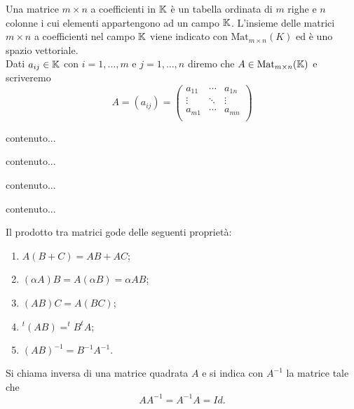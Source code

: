 
\begin{definition}[Matrice]
	Una matrice $ m \times n $ a coefficienti in $ \mathbb{K} $ è un tabella ordinata di $ m $ righe e $ n $ colonne i cui elementi appartengono ad un campo $ \mathbb{K} $. L'insieme delle matrici $ m \times n $ a coefficienti nel campo $ \mathbb{K} $ viene indicato con $ \mathrm{Mat}_{m \times n}{(K)} $ ed è uno spazio vettoriale. \\ Dati $ a_{ij} \in \mathbb{K} $ con $ i = 1, \ldots, m $ e $ j = 1, \ldots, n $ diremo che $ A \in \mathrm{Mat}_{m \times n} (\mathbb{K}) $ e scriveremo
	\[ A = (a_{ij}) =
	\begin{pmatrix}
		a_{11} & \cdots  & a_{1n} \\
		\vdots & \ddots & \vdots \\
		a_{m1} & \cdots  & a_{mn} \\
	\end{pmatrix}\]
\end{definition}

\begin{definition}
	contenuto...
\end{definition}

\begin{definition}
	contenuto...
\end{definition}

\begin{propriety}
	contenuto...
\end{propriety}

\begin{definition}
	contenuto...
\end{definition}

\begin{propriety}
	Il prodotto tra matrici gode delle seguenti proprietà:
	\begin{enumerate}[label=(\roman*)]
		\item $ A(B+C) = AB + AC $;
		\item $ (\alpha A)B = A(\alpha B) = \alpha AB $;
		\item $ (AB)C = A(BC) $;
		\item $ ^t(AB) = ^tB^tA $; %
		\item $(AB)^{-1} = B^{-1}A^{-1}.$
	\end{enumerate}
\end{propriety}

\begin{definition}
	Si chiama inversa di una matrice quadrata $A$ e si indica con $A^{-1}$ la matrice tale che
	\[AA^{-1}=A^{-1}A=Id.\]	
\end{definition}

